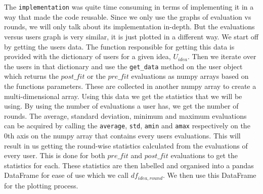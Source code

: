 \documentclass[12pt]{article}
\begin{document}
\\\\
The \texttt{implementation} was quite time consuming in terms of implementing it in a way that made the code reusable. Since we only use the graphs of evaluation vs rounds, we will only talk about its implementation in-depth. But the evaluations versus users graph is very similar, it is just plotted in a different way. We start off by getting the users data. The function responsible for getting this data is provided with the dictionary of users for a given idea, $U_{idea}$. Then we iterate over the users in that dictionary and use the \texttt{get\_data} method on the user object which returns the $post\_fit$ or the $pre\_fit$ evaluations as numpy arrays based on the functions parameters. These are collected in another numpy array to create a multi-dimensional array. Using this data we get the statistics that we will be using. By using the number of evaluations a user has, we get the number of rounds. The average, standard deviation, minimum and maximum evaluations can be acquired by calling the \texttt{average}, \texttt{std}, \texttt{amin} and \texttt{amax} respectively on the 0th axis on the numpy array that contains every users evaluations. This will result in us getting the round-wise statistics calculated from the evaluations of every user. This is done for both $pre\_fit$ and $post\_fit$ evaluations to get the statistics for each. These statistics are then labelled and organised into a pandas DataFrame for ease of use which we call $df_{idea, round}$. We then use this DataFrame for the plotting process.
\\\\
\end{document}
